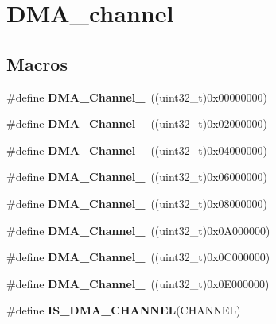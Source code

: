 \hypertarget{group___d_m_a__channel}{\section{D\-M\-A\-\_\-channel}
\label{group___d_m_a__channel}
}
\subsection*{Macros}
\begin{DoxyCompactItemize}
\item 
\hypertarget{group___d_m_a__channel_ga4979fc18bd59701dec52c8fa89b5edb2}{\#define {\bfseries D\-M\-A\-\_\-\-Channel\-\_}~((uint32\-\_\-t)0x00000000)}\label{group___d_m_a__channel_ga4979fc18bd59701dec52c8fa89b5edb2}

\item 
\hypertarget{group___d_m_a__channel_gacad41f71e3a940abd495b0aab3b4e8cb}{\#define {\bfseries D\-M\-A\-\_\-\-Channel\-\_}~((uint32\-\_\-t)0x02000000)}\label{group___d_m_a__channel_gacad41f71e3a940abd495b0aab3b4e8cb}

\item 
\hypertarget{group___d_m_a__channel_ga6b5d9fcfd72335777ce2796af6300574}{\#define {\bfseries D\-M\-A\-\_\-\-Channel\-\_}~((uint32\-\_\-t)0x04000000)}\label{group___d_m_a__channel_ga6b5d9fcfd72335777ce2796af6300574}

\item 
\hypertarget{group___d_m_a__channel_gaf835103c99f21d1b1c04d5c98471c1d5}{\#define {\bfseries D\-M\-A\-\_\-\-Channel\-\_}~((uint32\-\_\-t)0x06000000)}\label{group___d_m_a__channel_gaf835103c99f21d1b1c04d5c98471c1d5}

\item 
\hypertarget{group___d_m_a__channel_gac8a40bf3a421b434177e988263a3d787}{\#define {\bfseries D\-M\-A\-\_\-\-Channel\-\_}~((uint32\-\_\-t)0x08000000)}\label{group___d_m_a__channel_gac8a40bf3a421b434177e988263a3d787}

\item 
\hypertarget{group___d_m_a__channel_gae3dd5d28def40846aea8e3013d63311b}{\#define {\bfseries D\-M\-A\-\_\-\-Channel\-\_}~((uint32\-\_\-t)0x0\-A000000)}\label{group___d_m_a__channel_gae3dd5d28def40846aea8e3013d63311b}

\item 
\hypertarget{group___d_m_a__channel_ga141e89570dabba4f778e8e8df80e7812}{\#define {\bfseries D\-M\-A\-\_\-\-Channel\-\_}~((uint32\-\_\-t)0x0\-C000000)}\label{group___d_m_a__channel_ga141e89570dabba4f778e8e8df80e7812}

\item 
\hypertarget{group___d_m_a__channel_ga14f1265827ce49dad5075986118cc542}{\#define {\bfseries D\-M\-A\-\_\-\-Channel\-\_}~((uint32\-\_\-t)0x0\-E000000)}\label{group___d_m_a__channel_ga14f1265827ce49dad5075986118cc542}

\item 
\#define {\bfseries I\-S\-\_\-\-D\-M\-A\-\_\-\-C\-H\-A\-N\-N\-E\-L}(C\-H\-A\-N\-N\-E\-L)
\end{DoxyCompactItemize}


